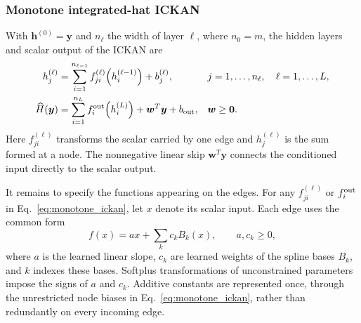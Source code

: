 \subsubsection{Monotone integrated-hat ICKAN}
\label{sec:ickan_core}
With $\bm h^{(0)}=\bm y$ and $n_\ell$ the width of layer $\ell$, where $n_0=m$, the hidden layers and scalar output of the ICKAN are
\begin{align}
 h_j^{(\ell)}
 &=\sum_{i=1}^{n_{\ell-1}}f_{ji}^{(\ell)}\!\left(h_i^{(\ell-1)}\right)
   +b_j^{(\ell)},
 &&j=1,\ldots,n_\ell,\quad \ell=1,\ldots,L,\nonumber\\
 \widehat H(\bm y)
 &=\sum_{i=1}^{n_L}f_i^{\rm out}\!\left(h_i^{(L)}\right)
   +\bm w^T\bm y+b_{\rm out},
 &&\bm w\geq\bm0.
 \label{eq:monotone_ickan}
\end{align}
Here $f_{ji}^{(\ell)}$ transforms the scalar carried by one edge and $h_j^{(\ell)}$ is the sum formed at a node. The nonnegative linear skip $\bm w^T\bm y$ connects the conditioned input directly to the scalar output.
\begin{samepage}
It remains to specify the functions appearing on the edges. For any $f_{ji}^{(\ell)}$ or $f_i^{\rm out}$ in Eq.~\eqref{eq:monotone_ickan}, let $x$ denote its scalar input. Each edge uses the common form
\begin{equation}
 f(x)=a x+\sum_k c_k B_k(x),\qquad a,c_k\geq0,
 \label{eq:splineedge}
\end{equation}
where $a$ is the learned linear slope, $c_k$ are learned weights of the spline bases $B_k$, and $k$ indexes these bases. Softplus transformations of unconstrained parameters impose the signs of $a$ and $c_k$. Additive constants are represented once, through the unrestricted node biases in Eq.~\eqref{eq:monotone_ickan}, rather than redundantly on every incoming edge.
\end{samepage}

